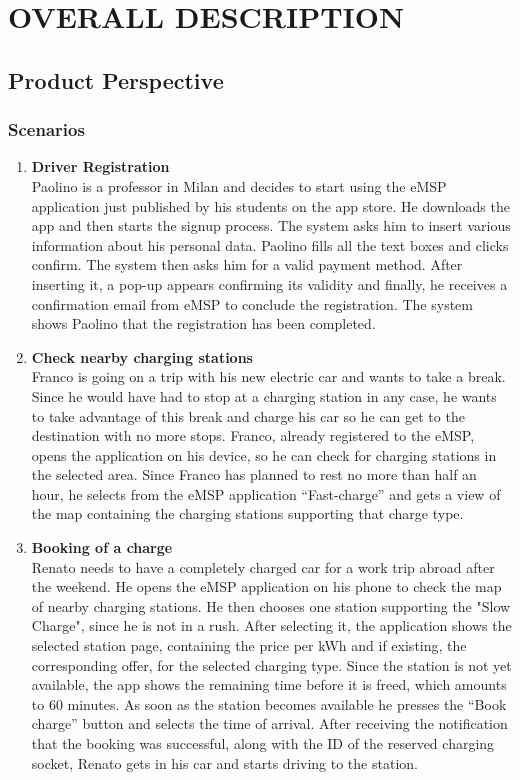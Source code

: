 \chapter{OVERALL DESCRIPTION}
\label{ch:overallDescription}%

\section{Product Perspective}
\label{sec:productPerspective}

\subsection{Scenarios} %
\label{subsec:scenarios}
\begin{enumerate}
\item \textbf{Driver Registration}\\
Paolino is a professor in Milan and decides to start using the eMSP application just published by his students on the app store.
He downloads the app and then starts the signup process. The system asks him to insert various information about his personal data. Paolino fills all the text boxes and clicks confirm. The system then asks him for a valid payment method. After inserting it, a pop-up appears confirming its validity and finally, he receives a confirmation email from eMSP to conclude the registration. The system shows Paolino that the registration has been completed.
\item \textbf{Check nearby charging stations}\\
Franco is going on a trip with his new electric car and wants to take a break. Since he would have had to stop at a charging station in any case, he wants to take advantage of this break and charge his car so he can get to the destination with no more stops.
Franco, already registered to the eMSP, opens the application on his device, so he can check for charging stations in the selected area. 
Since Franco has planned to rest no more than half an hour, he selects from the eMSP application “Fast-charge” and gets a view of the map containing the charging stations supporting that charge type.
\item \textbf{Booking of a charge}\\
Renato needs to have a completely charged car for a work trip abroad after the weekend. He opens the eMSP application on his phone to check the map of nearby charging stations. He then chooses one station supporting the "Slow Charge", since he is not in a rush. After selecting it, the application shows the selected station page, containing the price per kWh and if existing, the corresponding offer, for the selected charging type. Since the station is not yet available, the app shows the remaining time before it is freed, which amounts to 60 minutes. As soon as the station becomes available he presses the “Book charge” button and selects the time of arrival. After receiving the notification that the booking was successful, along with the ID of the reserved charging socket, Renato gets in his car and starts driving to the station.

\end{enumerate}
